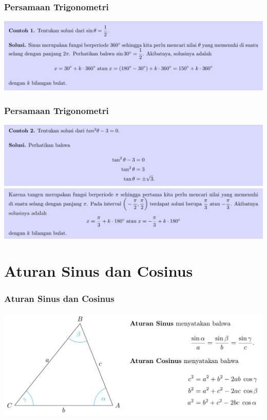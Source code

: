 \documentclass[pdflatex,compress,mathserif]{beamer}
\begin{document}
\begin{frame}
	\frametitle{Persamaan Trigonometri}
	\begin{center}
		\includegraphics[width=\linewidth]{img/img20}
	\end{center}
\end{frame}

\begin{frame}
	\frametitle{Persamaan Trigonometri}
	\begin{center}
		\includegraphics[width=\linewidth]{img/img21}
		\includegraphics[width=\linewidth]{img/img22}
	\end{center}
\end{frame}

\section{Aturan Sinus dan Cosinus}

\begin{frame}
	\frametitle{Aturan Sinus dan Cosinus}
	\begin{center}
		\includegraphics[width=\linewidth]{img/img23}
	\end{center}
\end{frame}
\end{document}
